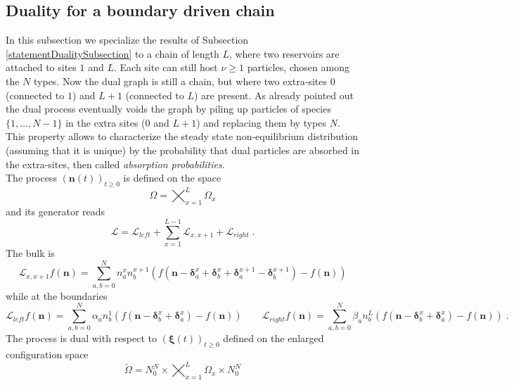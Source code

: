 \documentclass[10pt]{article}
\numberwithin{equation}{section}
\numberwithin{equation}{subsection}
\newcommand{\dt}{\;.}
\begin{document}
\subsection{Duality for a boundary driven chain}\label{Subsection-ss-nonI}
In this subsection we specialize the results of Subsection \ref{statementDualitySubsection} to a chain of length $L$, where two reservoirs are attached to sites $1$ and $L$. Each site can still host $\nu\geq 1$ particles, chosen among the $N$ types. Now the dual graph is still a chain, but where two extra-sites $0$ (connected to $1$) and $L+1$ (connected to $L$) are present. As already pointed out the dual process eventually voids the graph by piling up particles of species $\{1,\ldots,N-1\}$ in the extra sites ($0$ and $L+1$) and replacing them by types $N$. This property allows to characterize the steady state non-equilibrium distribution (assuming that it is unique) by the probability that dual particles are absorbed in the extra-sites, then called \textit{absorption probabilities}. \\The process $\left(\bm{n}(t)\right)_{t\geq0}$ is defined on the space
\begin{equation}\label{stateSpace-Chain}
	\Omega=\bigtimes_{x=1}^{L} \Omega_{x}
\end{equation} and its generator reads
\begin{equation}
	\mathcal{L}=\mathcal{L}_{left}+\sum_{x=1}^{L-1}\mathcal{L}_{x,x+1}+\mathcal{L}_{right}\dt
\end{equation} 
The bulk is 
\begin{equation}
	\mathcal{L}_{x,x+1}f(\bm{n})=\sum_{a,b=0}^{N}n_{a}^{x}n_{b}^{x+1}\left(f(\bm{n}-\bm{\delta}_{a}^{x}+\bm{\delta}_{b}^{x}+\bm{\delta}_{a}^{x+1}-\bm{\delta}_{b}^{x+1})-f(\bm{n})\right)
\end{equation}
while at the boundaries 
\begin{equation}
	\mathcal{L}_{left}f(\bm{n})=\sum_{a,b=0}^{N}\alpha_{a}n_{b}^{1}\left(f(\bm{n}-\bm{\delta}_{b}^{x}+\bm{\delta}_{a}^{x})-f(\bm{n})\right)\qquad \mathcal{L}_{right}f(\bm{n})=\sum_{a,b=0}^{N}\beta_{a}n_{b}^{L}\left(f(\bm{n}-\bm{\delta}_{b}^{x}+\bm{\delta}_{a}^{x})-f(\bm{n})\right)\dt
\end{equation}
The process is dual with respect to $(\bm{\xi}(t))_{t\geq0} $ defined on the enlarged configuration space
\begin{equation}\label{stateSpaceDUAL-Chain}	
	\widetilde{\Omega}=N_{0}^{N}\times\bigtimes_{x=1}^{L} \Omega_{x}\times N_{0}^{N}
\end{equation}
\end{document}
